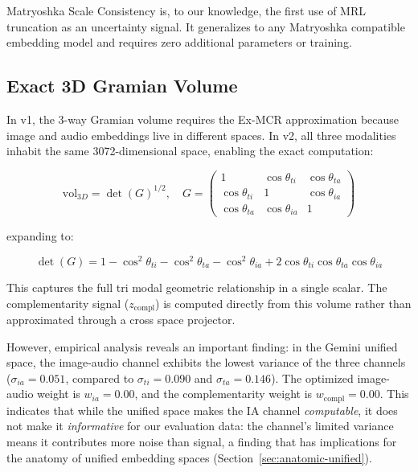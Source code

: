 \documentclass[a4paper,fleqn]{cas-sc}
\begin{document}
\begin{itemize}
Matryoshka Scale Consistency is, to our knowledge, the first use of MRL truncation as an uncertainty signal. It generalizes to any Matryoshka compatible embedding model and requires zero additional parameters or training.

\subsection{Exact 3D Gramian Volume}\label{sec:v2-exact-3d}

In v1, the 3-way Gramian volume requires the Ex-MCR approximation because image and audio embeddings live in different spaces. In v2, all three modalities inhabit the same 3072-dimensional space, enabling the exact computation:

\begin{equation}\label{eq:v2-3d-gram}
\mathrm{vol}_{3D} = \det(G)^{1/2}, \quad G = \begin{pmatrix} 1 & \cos\theta_{ti} & \cos\theta_{ta} \\ \cos\theta_{ti} & 1 & \cos\theta_{ia} \\ \cos\theta_{ta} & \cos\theta_{ia} & 1 \end{pmatrix}
\end{equation}

expanding to:

\begin{equation}\label{eq:v2-3d-det}
\det(G) = 1 - \cos^2\theta_{ti} - \cos^2\theta_{ta} - \cos^2\theta_{ia} + 2\cos\theta_{ti}\cos\theta_{ta}\cos\theta_{ia}
\end{equation}

This captures the full tri modal geometric relationship in a single scalar. The complementarity signal ($z_{\mathrm{compl}}$) is computed directly from this volume rather than approximated through a cross space projector.

However, empirical analysis reveals an important finding: in the Gemini unified space, the image-audio channel exhibits the lowest variance of the three channels ($\sigma_{ia} = 0.051$, compared to $\sigma_{ti} = 0.090$ and $\sigma_{ta} = 0.146$). The optimized image-audio weight is $w_{ia} = 0.00$, and the complementarity weight is $w_{\mathrm{compl}} = 0.00$. This indicates that while the unified space makes the IA channel \emph{computable}, it does not make it \emph{informative} for our evaluation data: the channel's limited variance means it contributes more noise than signal, a finding that has implications for the anatomy of unified embedding spaces (Section~\ref{sec:anatomic-unified}).

\end{itemize}
\end{document}
